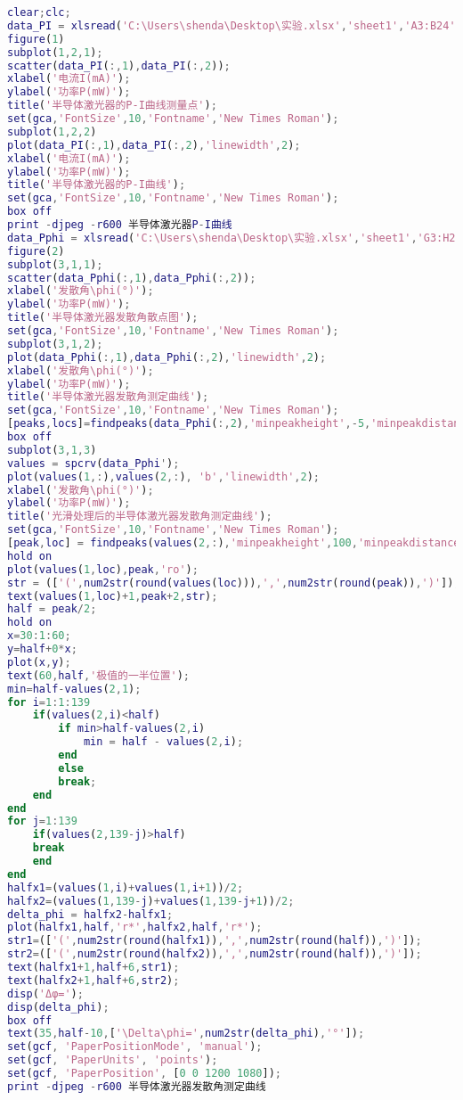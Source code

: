 \documentclass{zjureport}
\begin{document}
\begin{clause}
\begin{lstlisting}[language=MATLAB]
%半导体激光器的光学特性测试
clear;clc;
data_PI = xlsread('C:\Users\shenda\Desktop\实验.xlsx','sheet1','A3:B24');
figure(1)
subplot(1,2,1);
scatter(data_PI(:,1),data_PI(:,2));
xlabel('电流I(mA)');
ylabel('功率P(mW)');
title('半导体激光器的P-I曲线测量点');
set(gca,'FontSize',10,'Fontname','New Times Roman');
subplot(1,2,2)
plot(data_PI(:,1),data_PI(:,2),'linewidth',2);
xlabel('电流I(mA)');
ylabel('功率P(mW)');
title('半导体激光器的P-I曲线');
set(gca,'FontSize',10,'Fontname','New Times Roman');
box off
print -djpeg -r600 半导体激光器P-I曲线
data_Pphi = xlsread('C:\Users\shenda\Desktop\实验.xlsx','sheet1','G3:H22');
figure(2)
subplot(3,1,1);
scatter(data_Pphi(:,1),data_Pphi(:,2));
xlabel('发散角\phi(°)');
ylabel('功率P(mW)');
title('半导体激光器发散角散点图');
set(gca,'FontSize',10,'Fontname','New Times Roman');
subplot(3,1,2);
plot(data_Pphi(:,1),data_Pphi(:,2),'linewidth',2);
xlabel('发散角\phi(°)');
ylabel('功率P(mW)');
title('半导体激光器发散角测定曲线');
set(gca,'FontSize',10,'Fontname','New Times Roman');
[peaks,locs]=findpeaks(data_Pphi(:,2),'minpeakheight',-5,'minpeakdistance',1)
box off
subplot(3,1,3)
values = spcrv(data_Pphi');
plot(values(1,:),values(2,:), 'b','linewidth',2);
xlabel('发散角\phi(°)');
ylabel('功率P(mW)');
title('光滑处理后的半导体激光器发散角测定曲线');
set(gca,'FontSize',10,'Fontname','New Times Roman');
[peak,loc] = findpeaks(values(2,:),'minpeakheight',100,'minpeakdistance',50);
hold on
plot(values(1,loc),peak,'ro');
str = (['(',num2str(round(values(loc))),',',num2str(round(peak)),')']);
text(values(1,loc)+1,peak+2,str);
half = peak/2;
hold on
x=30:1:60;
y=half+0*x;
plot(x,y);
text(60,half,'极值的一半位置');
min=half-values(2,1);
for i=1:1:139
	if(values(2,i)<half)
		if min>half-values(2,i)
			min = half - values(2,i);
		end
		else
		break;
	end
end
for j=1:139
	if(values(2,139-j)>half)
	break
	end
end
halfx1=(values(1,i)+values(1,i+1))/2;
halfx2=(values(1,139-j)+values(1,139-j+1))/2;
delta_phi = halfx2-halfx1;
plot(halfx1,half,'r*',halfx2,half,'r*');
str1=(['(',num2str(round(halfx1)),',',num2str(round(half)),')']);
str2=(['(',num2str(round(halfx2)),',',num2str(round(half)),')']);
text(halfx1+1,half+6,str1);
text(halfx2+1,half+6,str2);
disp('Δφ=');
disp(delta_phi);
box off
text(35,half-10,['\Delta\phi=',num2str(delta_phi),'°']);
set(gcf, 'PaperPositionMode', 'manual');
set(gcf, 'PaperUnits', 'points');
set(gcf, 'PaperPosition', [0 0 1200 1080]);
print -djpeg -r600 半导体激光器发散角测定曲线
	\end{lstlisting}
\end{clause}
\end{document}
